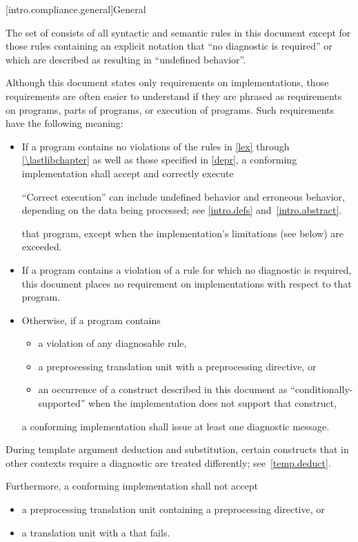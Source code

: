 [intro.compliance.general]{General}

\pnum
{}%
%
The set of
consists of all syntactic and semantic rules in this document
except for those rules containing an explicit notation that
``no diagnostic is required'' or which are described as resulting in
``undefined behavior''.

\pnum
{}%
Although this document states only requirements on \Cpp{}
implementations, those requirements are often easier to understand if
they are phrased as requirements on programs, parts of programs, or
execution of programs. Such requirements have the following meaning:
\begin{itemize}
\item
If a program contains no violations of the rules in
\ref{lex} through \ref{\lastlibchapter} as well as those specified in \ref{depr},
a conforming implementation shall accept and correctly execute
\begin{footnote}
``Correct execution'' can include undefined behavior
and erroneous behavior, depending on
the data being processed; see \ref{intro.defs} and~\ref{intro.abstract}.
\end{footnote}
that program,
except when the implementation's limitations (see below) are exceeded.
\item
{}%
If a program contains a violation of a rule for which no diagnostic is required,
this document places no requirement on implementations
with respect to that program.

\item
{}%
Otherwise, if a program contains
\begin{itemize}
\item
a violation of any diagnosable rule,
\item
a preprocessing translation unit with
a  preprocessing directive, or
\item
an occurrence
of a construct described in this document as ``conditionally-supported'' when
the implementation does not support that construct,
\end{itemize}
a conforming implementation
shall issue at least one diagnostic message.
\end{itemize}
\begin{note}
During template argument deduction and substitution,
certain constructs that in other contexts require a diagnostic
are treated differently;
see~\ref{temp.deduct}.
\end{note}
Furthermore, a conforming implementation
shall not accept
\begin{itemize}
\item
a preprocessing translation unit containing
a  preprocessing directive, or
\item
a translation unit with
a  that fails.
\end{itemize}

